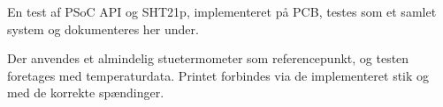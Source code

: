 
En test af PSoC API og SHT21p, implementeret på PCB, testes som et samlet system og dokumenteres her under.

Der anvendes et almindelig stuetermometer som referencepunkt, og testen foretages med temperaturdata.
Printet forbindes via de implementeret stik og med de korrekte spændinger. 